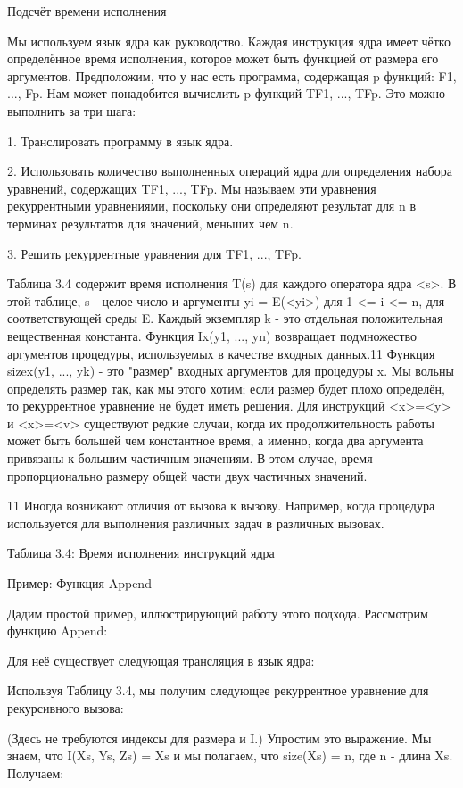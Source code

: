 Подсчёт времени исполнения

Мы используем язык ядра как руководство. Каждая инструкция ядра имеет чётко определённое время исполнения, которое может быть функцией от размера его аргументов. Предположим, что у нас есть программа, содержащая p функций: F1, ..., Fp. Нам может понадобится вычислить p функций TF1, ..., TFp. Это можно выполнить за три шага:

1. Транслировать программу в язык ядра.

2. Использовать количество выполненных операций ядра для определения набора уравнений, содержащих TF1, ..., TFp. Мы называем эти уравнения рекуррентными уравнениями, поскольку они определяют результат для n в терминах результатов для значений, меньших чем n.

3. Решить рекуррентные уравнения для TF1, ..., TFp.

Таблица 3.4 содержит время исполнения T(s) для каждого оператора ядра <s>. В этой таблице, s - целое число и аргументы yi = E(<yi>) для 1 <= i <= n, для соответствующей среды E. Каждый экземпляр k - это отдельная положительная вещественная константа. Функция Ix({y1, ..., yn}) возвращает подмножество аргументов процедуры, используемых в качестве входных данных.11 Функция sizex({y1, ..., yk}) - это "размер" входных аргументов для процедуры x. Мы вольны определять размер так, как мы этого хотим; если размер будет плохо определён, то рекуррентное уравнение не будет иметь решения. Для инструкций <x>=<y> и <x>=<v> существуют редкие случаи, когда их продолжительность работы может быть большей чем константное время, а именно, когда два аргумента привязаны к большим частичным значениям. В этом случае, время пропорционально размеру общей части двух частичных значений.

11 Иногда возникают отличия от вызова к вызову. Например, когда процедура используется для выполнения различных задач в различных вызовах.

Таблица 3.4: Время исполнения инструкций ядра

Пример: Функция Append

Дадим простой пример, иллюстрирующий работу этого подхода. Рассмотрим функцию Append:

Для неё существует следующая трансляция в язык ядра:

Используя Таблицу 3.4, мы получим следующее рекуррентное уравнение для рекурсивного вызова:

(Здесь не требуются индексы для размера и I.) Упростим это выражение. Мы знаем, что I({Xs, Ys, Zs}) = {Xs} и мы полагаем, что size({Xs}) = n, где n - длина Xs. Получаем:

